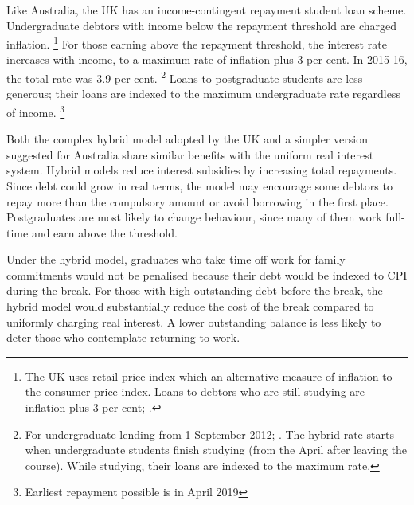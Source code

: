 \documentclass[embargoed]{grattan}
\begin{document}
Like Australia, the UK has an income-contingent repayment student loan scheme.
Undergraduate debtors with income below the repayment threshold are charged inflation.%
\footnote{The UK uses retail price index which an alternative measure of inflation to the consumer price index.
Loans to debtors who are still studying are inflation plus 3 per cent; \textcite{Company2015Studentloanrepayment}.} For those earning above the repayment threshold, the interest rate increases with income, to a maximum rate of inflation plus 3 per cent.
In 2015-16, the total rate was 3.9 per cent.%
\footnote{For undergraduate lending from 1 September 2012; \textcite{Company2015Studentloanrepayment}.
The hybrid rate starts when undergraduate students finish studying (from the April after leaving the course).
While studying, their loans are indexed to the maximum rate.} Loans to postgraduate students are less generous; their loans are indexed to the maximum undergraduate rate regardless of income.%
\footnote{Earliest repayment possible is in April 2019}

Both the complex hybrid model adopted by the UK and a simpler version suggested for Australia share similar benefits with the uniform real interest system.
Hybrid models reduce interest subsidies by increasing total repayments.
Since debt could grow in real terms, the model may encourage some debtors to repay more than the compulsory amount or avoid borrowing in the first place.
Postgraduates are most likely to change behaviour, since many of them work full-time and earn above the threshold.

Under the hybrid model, graduates who take time off work for family commitments would not be penalised because their debt would be indexed to \gls{CPI} during the break.
For those with high outstanding debt before the break, the hybrid model would substantially reduce the cost of the break compared to uniformly charging real interest.
A lower outstanding balance is less likely to deter those who contemplate returning to work.
\end{document}
